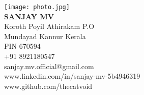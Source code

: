 \documentclass[a4paper,11pt]{article}
\begin{document}
\hspace{-0.8in}
\begin{minipage}[t]{0.4\textwidth}
    \texttt{[image: photo.jpg]} \\[1em]
    \textbf{\huge SANJAY MV} \\[1em]
    \color[RGB]{110,110,110}
    \selectfont
    Koroth Poyil Athirakam P.O \\
    Mundayad Kannur Kerala \\
    PIN 670594 \\[1em]
    +91 8921180547 \\[1em]
    sanjay.mv.official@gmail.com \\
    www.linkedin.com/in/sanjay-mv-5b4946319 \\
    www.github.com/thecatvoid
\end{minipage}
\end{document}
